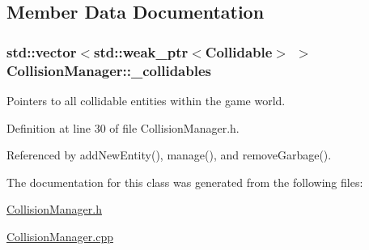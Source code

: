 \subsection{Member Data Documentation}
\hypertarget{classCollisionManager_a2a05a1861c85c833f8d229de43a00bb4}{
\subsubsection[{\-\_\-collidables}]{\setlength{\rightskip}{0pt plus 5cm}std\-::vector$<$std\-::weak\-\_\-ptr$<${\bf Collidable}$>$ $>$ Collision\-Manager\-::\-\_\-collidables\hspace{0.3cm}{\ttfamily [private]}}}\label{classCollisionManager_a2a05a1861c85c833f8d229de43a00bb4}


Pointers to all collidable entities within the game world. 



Definition at line 30 of file Collision\-Manager.\-h.



Referenced by add\-New\-Entity(), manage(), and remove\-Garbage().



The documentation for this class was generated from the following files\-:\begin{DoxyCompactItemize}
\item 
\hyperlink{CollisionManager_8h}{Collision\-Manager.\-h}\item 
\hyperlink{CollisionManager_8cpp}{Collision\-Manager.\-cpp}\end{DoxyCompactItemize}
